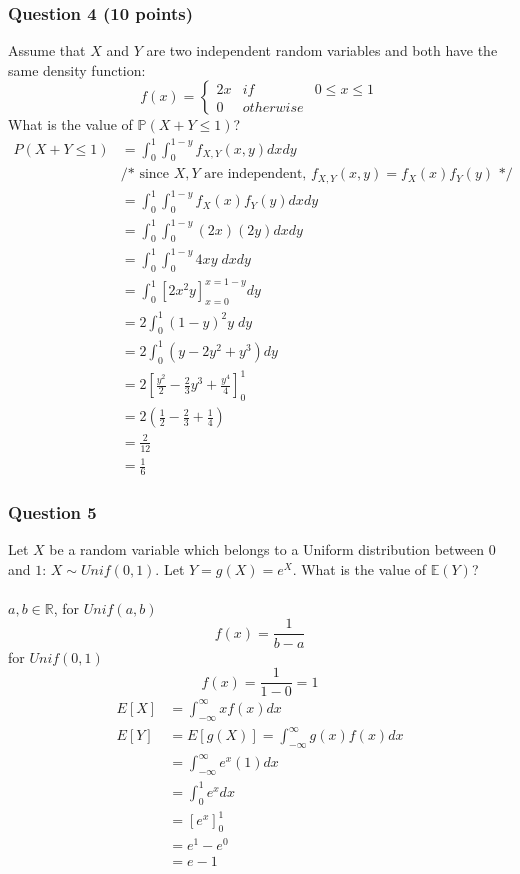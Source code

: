 \documentclass[12pt, border = 4pt, multi]{article} %
\begin{document}
\subsubsection*{Question 4 (10 points)}
Assume that $X$ and $Y$ are two 
independent random variables and 
both have the same density function: 
\begin{equation}
    f(x) =
    \left\{ \begin{array}{cll}
    2x & if & 0 \le x \le 1 \\ 
    0  & otherwise & 
\end{array} \right.
\end{equation}
What is the value of 
$\mathbb{P}(X + Y \le 1)$?
\\
\begin{align*}
P(X + Y \le 1) &= \int_0 ^ 1 \int_0 ^ {1 - y} f_{X, Y}(x, y) dx dy\\
&\text{/* since $X, Y$ are independent, $f_{X, Y}(x, y) = f_X(x)f_Y(y)$ */}\\
&= \int_0 ^ 1 \int_0 ^ {1 - y} f_X(x)f_Y(y) dx dy\\
&= \int_0 ^ 1 \int_0 ^ {1 - y} (2x)(2y) dx dy\\
&= \int_0 ^ 1 \int_0 ^ {1 - y} 4xy\; dx dy\\
&= \int_0 ^ 1 [2x ^ 2 y]_{x = 0} ^ {x = 1 - y} dy\\
&= 2\int_0 ^ 1 (1 - y) ^ 2 y\;dy\\
&= 2\int_0 ^ 1 (y - 2y ^ 2 + y ^ 3) dy\\
&= 2\left[\frac{y ^ 2}{2} - \frac{2}{3}y ^ 3 + \frac{y ^ 4}{4}\right]_0 ^ 1\\
&= 2\left(\frac{1}{2} - \frac{2}{3} + \frac{1}{4}\right)\\
&= \frac{2}{12}\\
&= \boxed{\frac{1}{6}}
\end{align*}
\newpage
\noindent
\subsubsection*{Question 5}
Let $X$ be a random variable which belongs 
to a Uniform distribution between 
$0$ and $1$: $X \sim Unif(0,1)$. Let 
$Y = g(X) = e^{X}$. What is the value 
of $\mathbb{E}(Y)$?\\
\\
$a, b \in \mathbb{R}$, for $Unif(a, b)$
\[f(x) = \frac{1}{b - a}\]
for $Unif(0, 1)$
\[f(x) = \frac{1}{1 - 0} = 1\]
\begin{align*}
E[X] &= \int_{-\infty} ^ {\infty} x f(x) dx\\
E[Y] &= E[g(X)] = \int_{-\infty} ^ {\infty} g(x) f(x) dx\\
&= \int_{-\infty} ^ {\infty} e ^ x (1) dx\\
&= \int_0 ^ 1 e ^ x dx\\
&= [e ^ x]_0 ^ 1\\
&= e ^ 1 - e ^ 0\\
&= \boxed{e - 1}\\
\end{align*}
\newpage
\noindent
\end{document}
